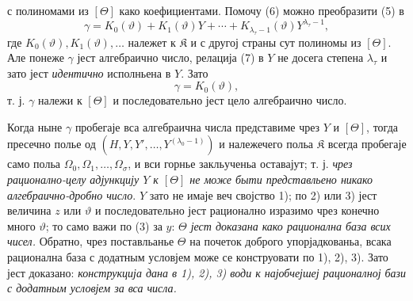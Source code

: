 ﻿\documentclass[11pt]{article}
\begin{document}
с полиномами из $[\Theta]$ како коефициентами. Помочу (6) можно преобразити
(5) в
\begin{equation}
\gamma=K_0(\vartheta)+K_1(\vartheta)Y+\cdots+
K_{\lambda_\tau-1}(\vartheta)Y^{\lambda_\tau-1},
\tag{7}
\end{equation}
где $K_0(\vartheta),K_1(\vartheta),\ldots$ належет к $\mathfrak K$ и с другој
страны сут полиномы из $[\Theta]$. Але понеже $\gamma$ јест алгебраично число,
релација (7) в $Y$ не досега степена $\lambda_\tau$ и зато јест {\itshape
идентично} исполньена в $Y$. Зато
\[
 \gamma=K_0(\vartheta),
\]
т. ј. $\gamma$ належи к $[\Theta]$ и последовательно јест цело алгебраично
число.

Когда ныне $\gamma$ пробегаје вса алгебраична числа представиме чрез $Y$ и
$[\Theta]$, тогда пресечно полье од $(H,Y,Y',\ldots,Y^{(\lambda_0-1)})$ и
належечего польа $\mathfrak K$
всегда пробегаје само польа $\Omega_0,\Omega_1,\ldots,\Omega_\sigma$, и вси
горнье закльученьа оставајут; т. ј. {\itshape чрез рационално-целу адјункцију
$Y$ к $[\Theta]$ не може быти представльено никако алгебраично-дробно число}.
$Y$ зато не имаје веч својство 1); по 2) или 3) јест величина $z$ или
$\vartheta$ и последовательно јест рационално изразимо чрез конечно много
$\vartheta$; то само важи по (3) за $y$: {\itshape $\Theta$ јест доказана како
рационална база всих чисел.} Обратно, чрез поставльанье $\Theta$ на почеток
доброго упорјадкованьа, всака рационална база с додатным условјем може се
конструовати по 1), 2), 3). Зато јест доказано: {\itshape конструкција дана в
1), 2), 3) води к најобчејшеј рационалној бази с додатным условјем за вса
числа.}
\end{document}
